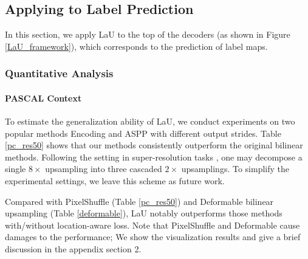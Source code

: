 \documentclass[10pt,twocolumn,letterpaper]{article}
\begin{document}
\subsection{Applying to Label Prediction}
In this section, we apply LaU to the top of the decoders (as shown in Figure \ref{LaU_framework}), which corresponds to the prediction of label maps.
\subsubsection{Quantitative Analysis}
\paragraph{PASCAL Context} To estimate the generalization ability of LaU, we conduct experiments on two popular methods Encoding \cite{EncNet} and ASPP \cite{ASPP} with different output strides. Table \ref{pc_res50} shows that our methods consistently outperform the original bilinear methods. Following the setting in super-resolution tasks \cite{LinSHR16,HeMWLY019,ShiCHTABRW16}, one may decompose a single $8\times$ upsampling into three cascaded $2\times$ upsamplings. To simplify the experimental settings, we leave this scheme as future work.

Compared with PixelShuffle \cite{ShiCHTABRW16} (Table \ref{pc_res50}) and Deformable \cite{DaiQXLZHW17} bilinear upsampling (Table \ref{deformable}), LaU notably outperforms those methods with/without location-aware loss. Note that PixelShuffle and Deformable cause damages to the performance; We show the visualization results and give a brief discussion in the appendix section 2. 
\end{document}
